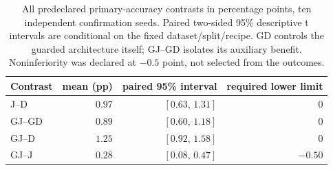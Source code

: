 \begin{table}[t]
\centering
\caption{All predeclared primary-accuracy contrasts in percentage points, ten independent confirmation seeds. Paired two-sided 95\% descriptive t intervals are conditional on the fixed dataset/split/recipe. GD controls the guarded architecture itself; GJ--GD isolates its auxiliary benefit. Noninferiority was declared at $-0.5$ point, not selected from the outcomes.}
\label{tab:benefit_contrasts}
\small
\begin{tabular}{lrrr}
\toprule
Contrast & mean (pp) & paired 95\% interval & required lower limit \\
\midrule
J--D & $0.97$ & $[0.63,\,1.31]$ & 0 \\
GJ--GD & $0.89$ & $[0.60,\,1.18]$ & 0 \\
GJ--D & $1.25$ & $[0.92,\,1.58]$ & 0 \\
GJ--J & $0.28$ & $[0.08,\,0.47]$ & $-0.50$ \\
\bottomrule
\end{tabular}
\end{table}
